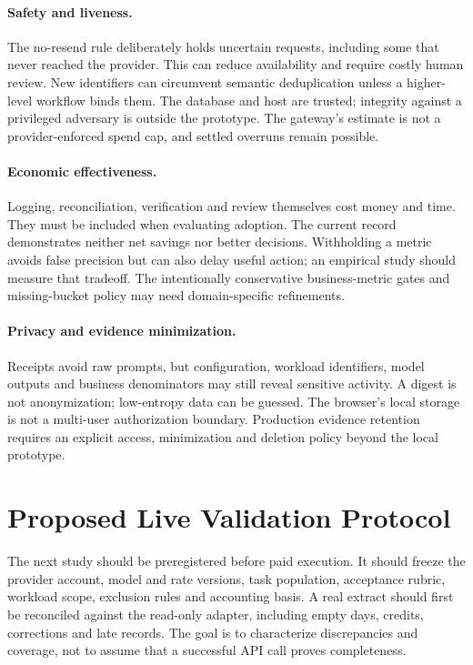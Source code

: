 \documentclass[10pt,twocolumn]{article}
\begin{document}
\paragraph{Safety and liveness.}
The no-resend rule deliberately holds uncertain requests, including some that never reached the provider. This can reduce availability and require costly human review. New identifiers can circumvent semantic deduplication unless a higher-level workflow binds them. The database and host are trusted; integrity against a privileged adversary is outside the prototype. The gateway's estimate is not a provider-enforced spend cap, and settled overruns remain possible.

\paragraph{Economic effectiveness.}
Logging, reconciliation, verification and review themselves cost money and time. They must be included when evaluating adoption. The current record demonstrates neither net savings nor better decisions. Withholding a metric avoids false precision but can also delay useful action; an empirical study should measure that tradeoff. The intentionally conservative business-metric gates and missing-bucket policy may need domain-specific refinements.

\paragraph{Privacy and evidence minimization.}
Receipts avoid raw prompts, but configuration, workload identifiers, model outputs and business denominators may still reveal sensitive activity. A digest is not anonymization; low-entropy data can be guessed. The browser's local storage is not a multi-user authorization boundary. Production evidence retention requires an explicit access, minimization and deletion policy beyond the local prototype.

\section{Proposed Live Validation Protocol}
\label{sec:future}

The next study should be preregistered before paid execution. It should freeze the provider account, model and rate versions, task population, acceptance rubric, workload scope, exclusion rules and accounting basis. A real extract should first be reconciled against the read-only adapter, including empty days, credits, corrections and late records. The goal is to characterize discrepancies and coverage, not to assume that a successful API call proves completeness.
\end{document}
